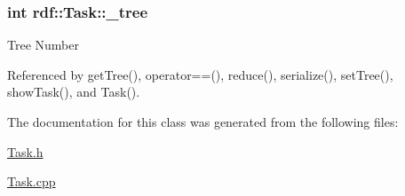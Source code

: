 \subsubsection[{\texorpdfstring{\+\_\+tree}{_tree}}]{\setlength{\rightskip}{0pt plus 5cm}int rdf\+::\+Task\+::\+\_\+tree\hspace{0.3cm}{\ttfamily [private]}}\hypertarget{classrdf_1_1Task_a3986abc1d8a8c79bde8d7525c6faa0bd}{}\label{classrdf_1_1Task_a3986abc1d8a8c79bde8d7525c6faa0bd}
Tree Number 

Referenced by get\+Tree(), operator==(), reduce(), serialize(), set\+Tree(), show\+Task(), and Task().



The documentation for this class was generated from the following files\+:\begin{DoxyCompactItemize}
\item 
\hyperlink{Task_8h}{Task.\+h}\item 
\hyperlink{Task_8cpp}{Task.\+cpp}\end{DoxyCompactItemize}
